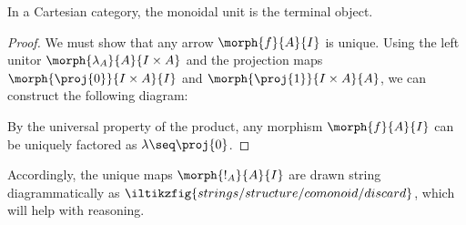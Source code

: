 \begin{lemma}
    In a Cartesian category, the monoidal unit is the terminal object.
\end{lemma}
\begin{proof}
    We must show that any arrow \(\morph{f}{A}{I}\) is unique.
    Using the left unitor \(\morph{\lambda_A}{A}{I \times A}\) and the
    projection maps \(\morph{\proj{0}}{I \times A}{I}\) and
    \(\morph{\proj{1}}{I \times A}{A}\), we can construct the following diagram:
    \begin{center}
        \vspace{0.5em}
    \end{center}
    By the universal property of the product, any morphism \(\morph{f}{A}{I}\)
    can be uniquely factored as \(\lambda \seq \proj{0}\).
\end{proof}

Accordingly, the unique maps \(\morph{!_A}{A}{I}\) are drawn string
diagrammatically as \(
\iltikzfig{strings/structure/comonoid/discard}
\), which will help with reasoning.

